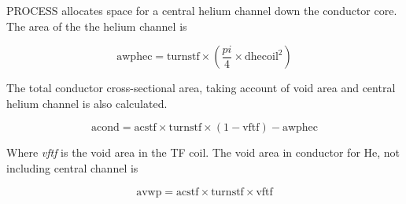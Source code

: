 \documentclass[hidelinks]{article}
\numberwithin{equation}{section}
\begin{document}
    \noi PROCESS allocates space for a central helium channel down the conductor 
    core. The area of the the helium channel is 
    
    \begin{equation}
        \text{awphec} = \text{turnstf} \times (\frac{pi}{4} \times \text{dhecoil}^2)
    \end{equation}

    \noi The total conductor cross-sectional area, taking account of void area and central 
    helium channel is also calculated.

    \begin{equation}
        \text{acond} = \text{acstf} \times \text{turnstf} \times 
        (1 - \text{vftf}) - \text{awphec}
    \end{equation}

    \noi Where \emph{vftf} is the void area in the TF coil. The void area in conductor for He, 
    not including central channel is 

    \begin{equation}
        \text{avwp} = \text{acstf} \times \text{turnstf} \times \text{vftf}
    \end{equation}
\end{document}
